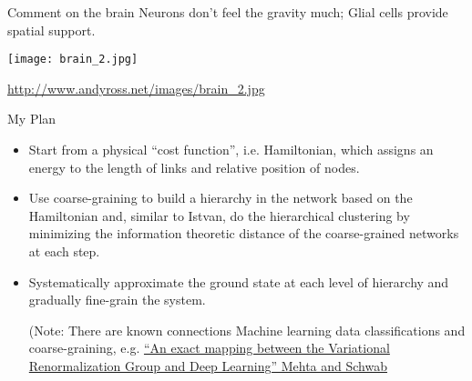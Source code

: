 \documentclass{beamer}%
\begin{document}
\begin{frame}{Comment on the brain}
Neurons don't feel the gravity much;
Glial cells provide spatial support. 

\centerline{\texttt{[image: brain\_2.jpg]}}
{\small \href{http://www.andyross.net/images/brain_2.jpg}{http://www.andyross.net/images/brain\_2.jpg}
}
\end{frame}

\begin{frame}{My Plan}
\begin{itemize}
\item Start from a physical ``cost function'', i.e. Hamiltonian, which assigns an energy to the length of links and relative  position of nodes. 
\item Use coarse-graining to build a hierarchy in the network based on the Hamiltonian and, similar to Istvan, do the hierarchical clustering by minimizing the information theoretic distance of the coarse-grained networks at each step. 

\item Systematically approximate the ground state at each level of hierarchy and gradually fine-grain the system. 

(Note: There are known connections Machine learning data classifications and coarse-graining, e.g. \href{http://arxiv.org/pdf/1410.3831v1.pdf}{``An exact mapping between the Variational Renormalization Group and Deep Learning'' Mehta and Schwab}
\end{itemize}


\end{frame}
\end{document}
